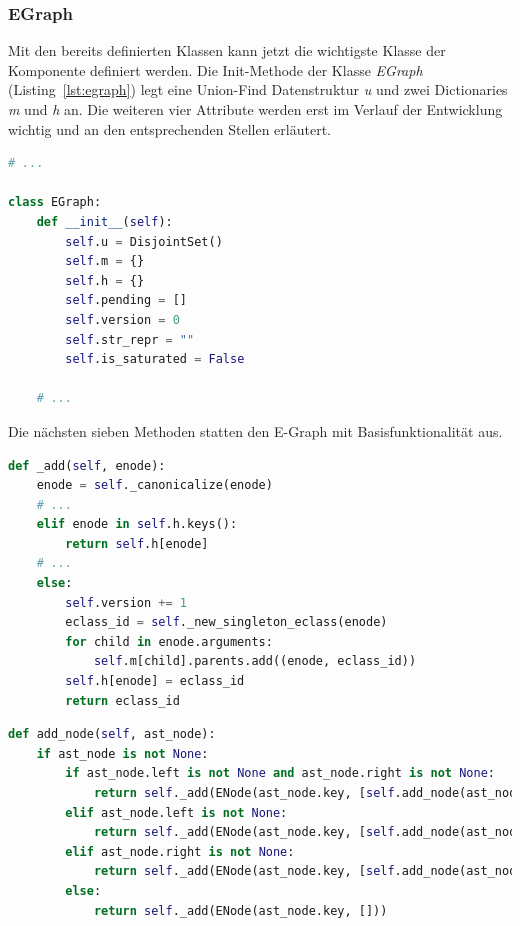 \subsubsection{EGraph}

Mit den bereits definierten Klassen kann jetzt die wichtigste Klasse der Komponente definiert werden. Die Init-Methode der Klasse \textit{EGraph} (Listing~\ref{lst:egraph})
legt eine Union-Find Datenstruktur \textit{u} und zwei Dictionaries \textit{m} und \textit{h} an. Die weiteren vier Attribute werden erst im Verlauf der Entwicklung wichtig und 
an den entsprechenden Stellen erläutert.

\begin{lstlisting}[language=Python, caption=Auszug aus der Klasse \textit{EGraph}, label={lst:egraph}]
# ... 

class EGraph:
    def __init__(self):
        self.u = DisjointSet()
        self.m = {}
        self.h = {}
        self.pending = []
        self.version = 0
        self.str_repr = ""
        self.is_saturated = False

    # ...
\end{lstlisting} 

Die nächsten sieben Methoden statten den E-Graph mit Basisfunktionalität aus.

\begin{lstlisting}[language=Python, caption=Auszug aus der Klasse \textit{EGraph}, label={lst:methods}]
def _add(self, enode):
    enode = self._canonicalize(enode)
    # ... 
    elif enode in self.h.keys():
        return self.h[enode]
    # ... 
    else:
        self.version += 1
        eclass_id = self._new_singleton_eclass(enode)
        for child in enode.arguments:
            self.m[child].parents.add((enode, eclass_id))
        self.h[enode] = eclass_id
        return eclass_id
\end{lstlisting} 

\begin{lstlisting}[language=Python, caption=Auszug aus der Klasse \textit{EGraph}, label={lst:methods}]
def add_node(self, ast_node):
    if ast_node is not None:
        if ast_node.left is not None and ast_node.right is not None:
            return self._add(ENode(ast_node.key, [self.add_node(ast_node.left), self.add_node(ast_node.right)],))
        elif ast_node.left is not None:
            return self._add(ENode(ast_node.key, [self.add_node(ast_node.left)]))
        elif ast_node.right is not None:
            return self._add(ENode(ast_node.key, [self.add_node(ast_node.right)]))
        else:
            return self._add(ENode(ast_node.key, []))
\end{lstlisting} 

